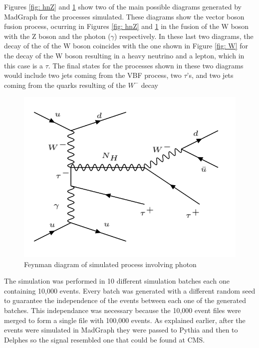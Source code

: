 Figures \ref{fig: hnZ} and \ref{fig: hnGamma} show two of the main possible diagrams generated by MadGraph for the processes simulated. These diagrams show the vector boson fusion process, ocurring in Figures \ref{fig: hnZ} and \ref{fig: hnGamma} in the fusion of the W boson with the Z boson and the photon ($\gamma$) respectively. In these last two diagrams, the decay of the of the W boson coincides with the one shown in Figure \ref{fig: W} for the decay of the W boson resulting in a heavy neutrino and a lepton, which in this case is a $\tau$. The final states for the processes shown in these two diagrams would include two jets coming from the VBF process, two $\tau$'s, and two jets coming from the quarks resulting of the $W^{-}$ decay

\begin{figure}[H]
\centering
\includegraphics[scale = 0.45]{Figures/Feynman_hnGamma}
\caption{Feynman diagram of simulated process involving photon}
\label{fig: hnGamma}
\end{figure}

The simulation was performed in 10 different simulation batches each one containing 10,000 events. Every batch was generated with a different random seed to guarantee the independence of the events between each one of the generated batches. This independance was necessary because the 10,000 event files were merged to form a single file with 100,000 events. As explained earlier, after the events were simulated in MadGraph they were passed to Pythia and then to Delphes so the signal resembled one that could be found at CMS.  

